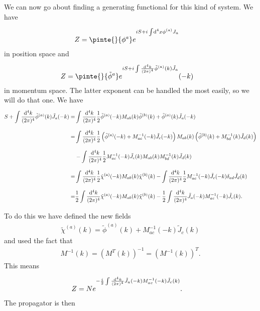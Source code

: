 We can now go about finding a generating functional for this kind of system. We have
\begin{align*}
	Z &= \pinte{}{\phi^{a}}e^{iS + i\integ[4]{}{}{x}{\phi^{(a)}J_{a}}}
\end{align*}
in position space and
\begin{align*}
	Z &= \pinte{}{\tilde{\phi}^{a}}e^{iS + i\inte{}{}\frac{\dd[4]{k}}{(2\pi)^{4}}\tilde{\phi}^{(a)}(k)\tilde{J}_{a}}(-k)
\end{align*}
in momentum space. The latter exponent can be handled the most easily, so we will do that one. We have
\begin{align*}
	S + \int\limits_{}^{}\frac{\dd[4]{k}}{(2\pi)^{4}}\tilde{\phi}^{(a)}(k)\tilde{J}_{a}(-k) =& \int\limits_{}^{}\frac{\dd[4]{k}}{(2\pi)^{4}}\frac{1}{2}\tilde{\phi}^{(a)}(-k)M_{ab}(k)\tilde{\phi}^{(b)}(k) + \tilde{\phi}^{(a)}(k)\tilde{J}_{a}(-k) \\
	=& \int\limits_{}^{}\frac{\dd[4]{k}}{(2\pi)^{4}}\frac{1}{2}\left(\tilde{\phi}^{(a)}(-k) + M_{ac}^{-1}(-k)\tilde{J}_{c}(-k)\right)M_{ab}(k)\left(\tilde{\phi}^{(b)}(k) + M_{bd}^{-1}(k)\tilde{J}_{d}(k)\right) \\
	 &- \int\limits_{}^{}\frac{\dd[4]{k}}{(2\pi)^{4}}\frac{1}{2}M_{ac}^{-1}(-k)\tilde{J}_{c}(k)M_{ab}(k)M_{bd}^{-1}(k)\tilde{J}_{d}(k) \\
	=& \int\limits_{}^{}\frac{\dd[4]{k}}{(2\pi)^{4}}\frac{1}{2}\tilde{\chi}^{(a)}(-k)M_{ab}(k)\tilde{\chi}^{(b)}(k) - \int\limits_{}^{}\frac{\dd[4]{k}}{(2\pi)^{4}}\frac{1}{2}M_{ac}^{-1}(-k)\tilde{J}_{c}(-k)\delta_{ad}\tilde{J}_{d}(k) \\
	=& \frac{1}{2}\int\limits_{}^{}\frac{\dd[4]{k}}{(2\pi)^{4}}\tilde{\chi}^{(a)}(-k)M_{ab}(k)\tilde{\chi}^{(b)}(k) - \frac{1}{2}\int\limits_{}^{}\frac{\dd[4]{k}}{(2\pi)^{4}}\tilde{J}_{a}(-k)M_{ac}^{-1}(-k)\tilde{J}_{c}(k).
\end{align*}
To do this we have defined the new fields
\begin{align*}
	\tilde{\chi}^{(a)}(k) = \tilde{\phi}^{(a)}(k) + M_{ac}^{-1}(-k)\tilde{J}_{c}(k)
\end{align*}
and used the fact that
\begin{align*}
	M^{-1}(k) = (M^{T}(k))^{-1} = (M^{-1}(k))^{T}.
\end{align*}
This means
\begin{align*}
	Z &= Ne^{-\frac{i}{2}\int\limits_{}^{}\frac{\dd[4]{k}}{(2\pi)^{4}}\tilde{J}_{a}(-k)M_{ac}^{-1}(-k)\tilde{J}_{c}(k)}.
\end{align*}
The propagator is then
